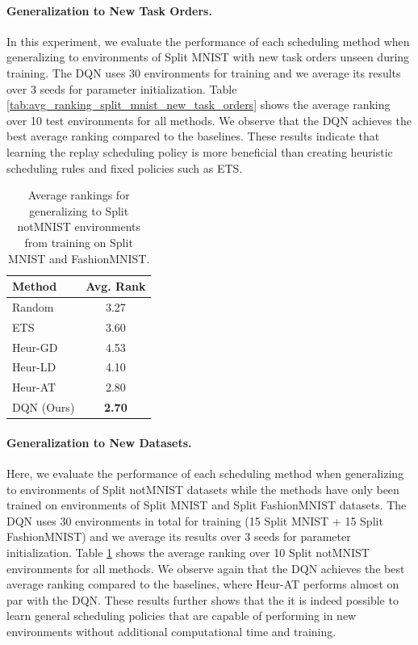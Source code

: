 \paragraph{Generalization to New Task Orders.} In this experiment, we evaluate the performance of each scheduling method when generalizing to environments of Split MNIST with new task orders unseen during training. The DQN uses 30 environments for training and we average its results over 3 seeds for parameter initialization. Table \ref{tab:avg_ranking_split_mnist_new_task_orders} shows the average ranking over 10 test environments for all methods. We observe that the DQN achieves the best average ranking compared to the baselines. These results indicate that learning the replay scheduling policy is  more beneficial than creating heuristic scheduling rules and fixed policies such as ETS. 



\vspace{-2mm}
\begin{table}
	\footnotesize
	\vspace{-5mm}
	\captionsetup{width=.84\linewidth}
	\caption{Average rankings for generalizing to Split notMNIST environments from training on Split MNIST and FashionMNIST. 
	}
	\label{tab:avg_ranking_split_notmnist_new_dataset}
	\vspace{-7mm}
	\begin{tabular}{l c} \\
		\toprule  
		{\bf Method} 	& {\bf Avg. Rank} \\ 
		\midrule
		Random 			& 3.27 \\
		ETS 			& 3.60 \\
		Heur-GD 		& 4.53 \\
		Heur-LD 		& 4.10 \\
		Heur-AT 		& 2.80 \\
		\midrule
		DQN (Ours)		& {\bf 2.70} \\
		\bottomrule
	\end{tabular}
\end{table} 
\paragraph{Generalization to New Datasets.} Here, we evaluate the performance of each scheduling method when generalizing to environments of Split notMNIST datasets while the methods have only been trained on environments of Split MNIST and Split FashionMNIST datasets. The DQN uses 30 environments in total for training (15 Split MNIST + 15 Split FashionMNIST) and we average its results over 3 seeds for parameter initialization. Table \ref{tab:avg_ranking_split_notmnist_new_dataset} shows the average ranking over 10 Split notMNIST environments for all methods. We observe again that the DQN achieves the best average ranking compared to the baselines, where Heur-AT performs almost on par with the DQN. These results further shows that the it is indeed possible to learn general scheduling policies that are capable of performing in new environments without additional computational time and training. 


